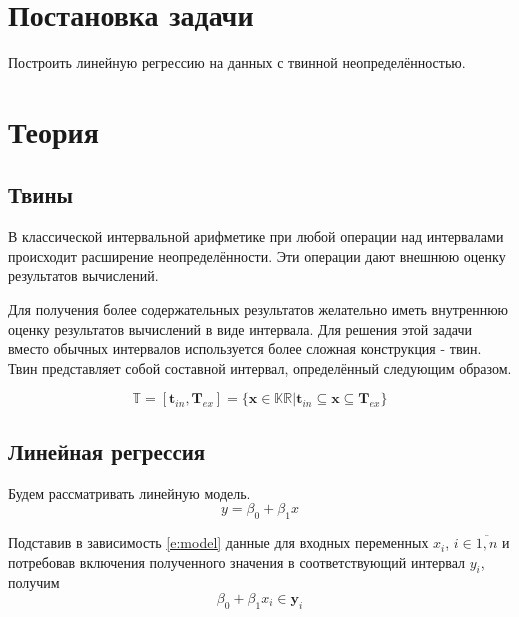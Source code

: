 \documentclass[a4paper,12pt]{article}
\begin{document}
    
    \newpage

    \tableofcontents
    \listoffigures
    \newpage

    \section{Постановка задачи}
    Построить линейную регрессию на данных с твинной неопределённостью.

    \section{Теория}
    \subsection{Твины}
    \quad В классической интервальной арифметике при любой операции над интервалами происходит расширение неопределённости.
    Эти операции дают внешнюю оценку результатов вычислений.
    
    Для получения более содержательных результатов желательно иметь внутреннюю оценку результатов вычислений в виде интервала.
    Для решения этой задачи вместо обычных интервалов используется более сложная конструкция - твин.
    Твин представляет собой составной интервал, определённый следующим образом.

    \begin{equation}
        \mathbb{T} = [\textbf{t}_{in}, \textbf{T}_{ex}] = \{\textbf{x} \in \mathbb{KR} | \textbf{t}_{in} \subseteq \textbf{x} \subseteq \textbf{T}_{ex} \}
    \end{equation}

    \subsection{Линейная регрессия}
    Будем рассматривать линейную модель.
    \begin{equation}
        y = \beta_0 + \beta_1 x
        \label{e:model}
    \end{equation}

    Подставив в зависимость \ref{e:model} данные для входных переменных $ x_i $, $ i \in \overline{1, n} $
    и потребовав включения полученного значения в соответствующий интервал $ y_i $, получим
    \begin{equation}
        \beta_0 + \beta_1 x_i \in \textbf{y}_i
        \label{e:modelCondition}
    \end{equation}
\end{document}
